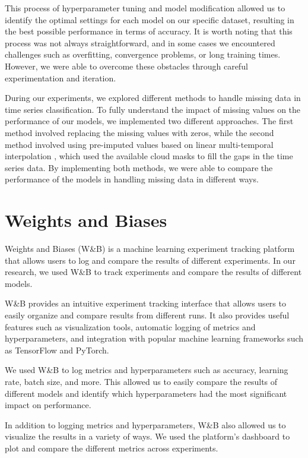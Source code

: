This process of hyperparameter tuning and model modification allowed us to identify the optimal settings for each model on our specific dataset, resulting in the best possible performance in terms of accuracy.
It is worth noting that this process was not always straightforward, and in some cases we encountered challenges such as overfitting, convergence problems, or long training times.
However, we were able to overcome these obstacles through careful experimentation and iteration.

During our experiments, we explored different methods to handle missing data in time series classification. 
To fully understand the impact of missing values on the performance of our models, we implemented two different approaches.
The first method involved replacing the missing values with zeros, while the second method involved using pre-imputed values based on linear multi-temporal interpolation \cite{IENCO201911}, which used the available cloud masks to fill the gaps in the time series data. 
By implementing both methods, we were able to compare the performance of the models in handling missing data in different ways.


\section{Weights and Biases}

Weights and Biases (W\&B) \cite{wandb} is a machine learning experiment tracking platform that allows users to log and compare the results of different experiments. 
In our research, we used W\&B to track experiments and compare the results of different models.

W\&B provides an intuitive experiment tracking interface that allows users to easily organize and compare results from different runs.
It also provides useful features such as visualization tools, automatic logging of metrics and hyperparameters, and integration with popular machine learning frameworks such as TensorFlow and PyTorch.

We used W\&B to log metrics and hyperparameters such as accuracy, learning rate, batch size, and more. 
This allowed us to easily compare the results of different models and identify which hyperparameters had the most significant impact on performance.

In addition to logging metrics and hyperparameters, W\&B also allowed us to visualize the results in a variety of ways. 
We used the platform's dashboard to plot and compare the different metrics across experiments.

